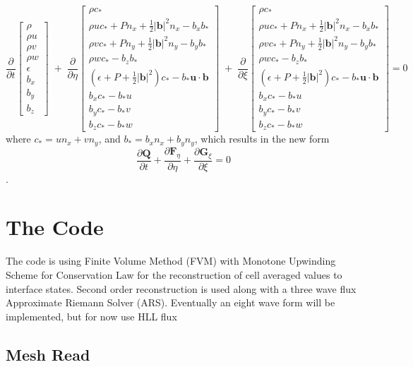 \documentclass[paper=a4, fontsize=11pt]{scrartcl}
\newcommand{\pfrac}[2]{\frac{\partial#1}{\partial#2}}
\numberwithin{equation}{section}                %
\numberwithin{figure}{section}                  %
\numberwithin{table}{section}                           %
\begin{document}
\[
  \pfrac{}{t}
  \begin{bmatrix}
    \rho  \\
    \rho u  \\
    \rho v \\
    \rho w \\
    \epsilon\\
    b_x \\
    b_y \\
    b_z 
  \end{bmatrix}
  \;+\;\pfrac{}{\eta}
  \begin{bmatrix}
    \rho c_*  \\
    \rho u c_* + P n_x + \frac{1}{2}|\mathbf{b}|^2 n_x- b_x b_*\\
    \rho v c_* + P n_y + \frac{1}{2}|\mathbf{b}|^2 n_y - b_y b_* \\
    \rho w c_* - b_z b_*\\
    \left(\epsilon+ P + \frac{1}{2}|\mathbf{b}|^2 \right) c_* - b_* \mathbf{u}\cdot\mathbf{b}\\
    b_x c_* - b_* u\\
    b_y c_* - b_* v \\
    b_z c_* - b_* w 
  \end{bmatrix}
  \;+\;\pfrac{}{\xi}
  \begin{bmatrix}
    \rho c_*  \\
    \rho u c_* + P n_x + \frac{1}{2}|\mathbf{b}|^2 n_x - b_x b_* \\
    \rho v c_* + P n_y + \frac{1}{2}|\mathbf{b}|^2 n_y - b_y b_* \\
    \rho w c_* - b_z b_* \\
    \left(\epsilon+ P + \frac{1}{2}|\mathbf{b}|^2  \right) c_* - b_*\mathbf{u}\cdot\mathbf{b}\\
    b_x c_* - b_* u \\
    b_y c_* - b_* v \\
    b_z c_* - b_* w 
  \end{bmatrix}
  =0
\]
where $c_* = u n_x + v n_y$, and $b_* = b_x n_x + b_y n_y $, which results in the new form
\begin{equation} \label{eqn:mhdvecfluxarb}
  \pfrac{\mathbf{Q}}{t} + \pfrac{\mathbf{F}_\eta}{\eta} + \pfrac{\mathbf{G}_\xi}{\xi} = 0
\end{equation}.

\section{The Code}
The code is using Finite Volume Method (FVM) with Monotone Upwinding Scheme for Conservation Law for the reconstruction of cell averaged values to interface states. Second order reconstruction is used along with a three wave flux Approximate Riemann Solver (ARS). Eventually an eight wave form will be implemented, but for now use HLL flux \cite{harten1983}

\subsection{Mesh Read}




 
  
\end{document}
